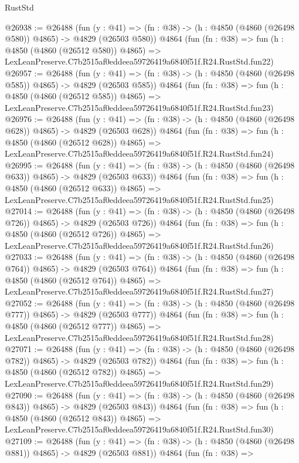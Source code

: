 \begin{lexlean}{RustStd}
\begin{coremodule}
@26938 := @26488
    (fun (y : @41) => (fn : @38) -> (h : @4850 (@4860 (@26498 @580)) @4865) -> @4829 (@26503 @580))
    @4864
    (fun (fn : @38) =>
    fun (h : @4850 (@4860 (@26512 @580)) @4865) =>
    LexLeanPreserve.C7b2515af0eddeea59726419a6840f51f.R24.RustStd.fun22)
@26957 := @26488
    (fun (y : @41) => (fn : @38) -> (h : @4850 (@4860 (@26498 @585)) @4865) -> @4829 (@26503 @585))
    @4864
    (fun (fn : @38) =>
    fun (h : @4850 (@4860 (@26512 @585)) @4865) =>
    LexLeanPreserve.C7b2515af0eddeea59726419a6840f51f.R24.RustStd.fun23)
@26976 := @26488
    (fun (y : @41) => (fn : @38) -> (h : @4850 (@4860 (@26498 @628)) @4865) -> @4829 (@26503 @628))
    @4864
    (fun (fn : @38) =>
    fun (h : @4850 (@4860 (@26512 @628)) @4865) =>
    LexLeanPreserve.C7b2515af0eddeea59726419a6840f51f.R24.RustStd.fun24)
@26995 := @26488
    (fun (y : @41) => (fn : @38) -> (h : @4850 (@4860 (@26498 @633)) @4865) -> @4829 (@26503 @633))
    @4864
    (fun (fn : @38) =>
    fun (h : @4850 (@4860 (@26512 @633)) @4865) =>
    LexLeanPreserve.C7b2515af0eddeea59726419a6840f51f.R24.RustStd.fun25)
@27014 := @26488
    (fun (y : @41) => (fn : @38) -> (h : @4850 (@4860 (@26498 @726)) @4865) -> @4829 (@26503 @726))
    @4864
    (fun (fn : @38) =>
    fun (h : @4850 (@4860 (@26512 @726)) @4865) =>
    LexLeanPreserve.C7b2515af0eddeea59726419a6840f51f.R24.RustStd.fun26)
@27033 := @26488
    (fun (y : @41) => (fn : @38) -> (h : @4850 (@4860 (@26498 @764)) @4865) -> @4829 (@26503 @764))
    @4864
    (fun (fn : @38) =>
    fun (h : @4850 (@4860 (@26512 @764)) @4865) =>
    LexLeanPreserve.C7b2515af0eddeea59726419a6840f51f.R24.RustStd.fun27)
@27052 := @26488
    (fun (y : @41) => (fn : @38) -> (h : @4850 (@4860 (@26498 @777)) @4865) -> @4829 (@26503 @777))
    @4864
    (fun (fn : @38) =>
    fun (h : @4850 (@4860 (@26512 @777)) @4865) =>
    LexLeanPreserve.C7b2515af0eddeea59726419a6840f51f.R24.RustStd.fun28)
@27071 := @26488
    (fun (y : @41) => (fn : @38) -> (h : @4850 (@4860 (@26498 @782)) @4865) -> @4829 (@26503 @782))
    @4864
    (fun (fn : @38) =>
    fun (h : @4850 (@4860 (@26512 @782)) @4865) =>
    LexLeanPreserve.C7b2515af0eddeea59726419a6840f51f.R24.RustStd.fun29)
@27090 := @26488
    (fun (y : @41) => (fn : @38) -> (h : @4850 (@4860 (@26498 @843)) @4865) -> @4829 (@26503 @843))
    @4864
    (fun (fn : @38) =>
    fun (h : @4850 (@4860 (@26512 @843)) @4865) =>
    LexLeanPreserve.C7b2515af0eddeea59726419a6840f51f.R24.RustStd.fun30)
@27109 := @26488
    (fun (y : @41) => (fn : @38) -> (h : @4850 (@4860 (@26498 @881)) @4865) -> @4829 (@26503 @881))
    @4864
    (fun (fn : @38) =>

\end{coremodule}
\end{lexlean}
